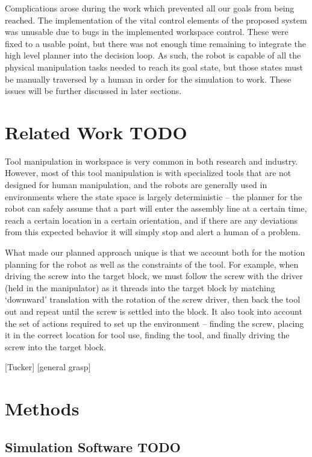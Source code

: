 \documentclass[10pt, conference]{IEEEtran}
\begin{document}
  Complications arose during the work which prevented all our goals from
  being reached. The implementation of the vital control elements of the
  proposed system was unusable due to bugs in the implemented workspace
  control. These were fixed to a usable point, but there was not enough
  time remaining to integrate the high level planner into the decision
  loop. As such, the robot is capable of all the physical manipulation
  tasks needed to reach its goal state, but those states must be
  manually traversed by a human in order for the simulation to
  work. These issues will be further discussed in later sections.
\section{Related Work TODO}
\label{sec-2}

  Tool manipulation in workspace is very common in both research and
  industry. However, most of this tool manipulation is with specialized
  tools that are not designed for human manipulation, and the robots are
  generally used in environments where the state space is largely
  deterministic -- the planner for the robot can safely assume that a
  part will enter the assembly line at a certain time, reach a certain
  location in a certain orientation, and if there are any deviations
  from this expected behavior it will simply stop and alert a human of a
  problem.

  What made our planned approach unique is that we account both for the
  motion planning for the robot as well as the constraints of the
  tool. For example, when driving the screw into the target block, we
  must follow the screw with the driver (held in the manipulator) as it
  threads into the target block by matching `downward' translation with
  the rotation of the screw driver, then back the tool out and repeat
  until the screw is settled into the block. It also took into account
  the set of actions required to set up the environment -- finding the
  screw, placing it in the correct location for tool use, finding the
  tool, and finally driving the screw into the target block.

  [Tucker]
  [general grasp]
\section{Methods}
\label{sec-3}
\subsection{Simulation Software TODO}
\label{sec-3-1}
\end{document}
